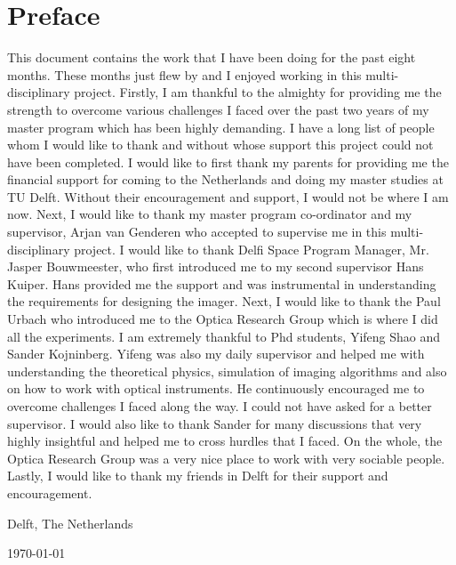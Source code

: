 \chapter*{Preface}
This document contains the work that I have been doing for the past eight months. These months just flew by and I enjoyed working in this multi-disciplinary project. Firstly, I am thankful to the almighty for providing me the strength to overcome various challenges I faced over the past two years of my master program which has been highly demanding. I have a long list of people whom I would like to thank and without whose support this project could not have been completed.
I would like to first thank my parents for providing me the financial support for coming to the Netherlands and doing my master studies at TU Delft. Without their encouragement and support, I would not be where I am now. Next, I would like to thank my master program co-ordinator and my supervisor, Arjan van Genderen who accepted to supervise me in this multi-disciplinary project. I would like to thank Delfi Space Program Manager, Mr. Jasper Bouwmeester, who first introduced me to my second supervisor Hans Kuiper. Hans provided me the support and was instrumental in understanding the requirements for designing the imager. Next, I would like to thank the Paul Urbach who introduced me to the Optica Research Group which is where I did all the experiments. I am extremely thankful to Phd students, Yifeng Shao and Sander Kojninberg. Yifeng was also my daily supervisor and helped me with understanding the theoretical physics, simulation of imaging algorithms and also on how to work with optical instruments. He continuously encouraged me to overcome challenges I faced along the way. I could not have asked for a better supervisor. I would also like to thank Sander for many discussions that very highly insightful and helped me to cross hurdles that I faced. On the whole, the Optica Research Group was a very nice place to work with very sociable people. Lastly, I would like to thank my friends in Delft for their support and encouragement. 


\noindent
Delft, The Netherlands

\noindent
\today
